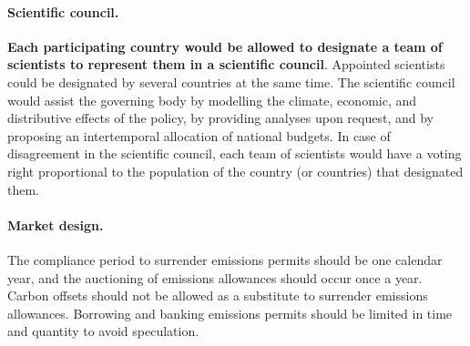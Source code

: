 \documentclass[12pt,english]{article}
\begin{document}
\paragraph{Scientific council.}
\textbf{Each participating country would be allowed to designate a team of scientists to represent them in a scientific council}. Appointed scientists could be designated by several countries at the same time. The scientific council would assist the governing body by modelling the climate, economic, and distributive effects of the policy, by providing analyses upon request, and by proposing an intertemporal allocation of national budgets. In case of disagreement in the scientific council, each team of scientists would have a voting right proportional to the population %
of the country (or countries) that designated them.


\paragraph{Market design.} 
The compliance period to surrender emissions permits should be one calendar year, and the auctioning of emissions allowances should occur once a year. Carbon offsets should not be allowed as a substitute to surrender emissions allowances. Borrowing and banking emissions permits should be limited in time and quantity to avoid speculation. %

\end{document}
